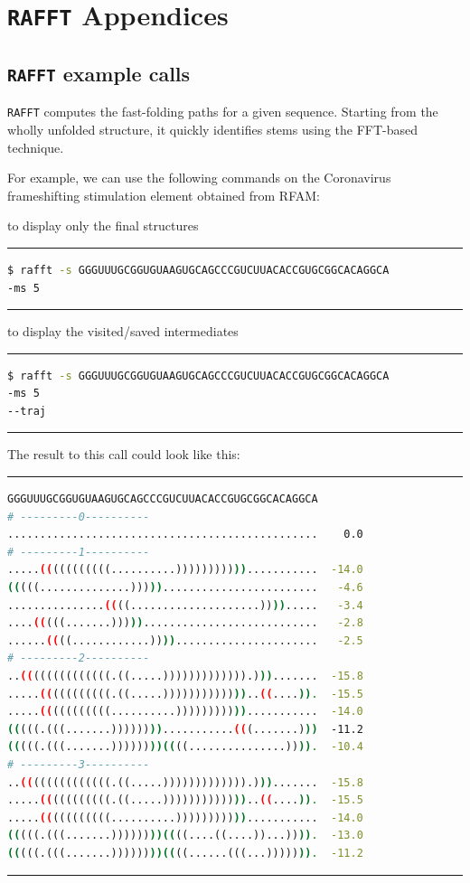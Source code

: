 \chapter{\texttt{RAFFT} Appendices}

\section{\texttt{RAFFT} example calls}

\texttt{RAFFT}  computes the fast-folding paths for a given sequence. Starting from the wholly unfolded structure, it quickly identifies stems using the FFT-based technique.

For example, we can use the following commands on the Coronavirus frameshifting stimulation element obtained from RFAM:

\noindent to display only the final structures

\noindent \rule{12cm}{0.4pt}
\begin{lstlisting}[language=bash, caption={Command line to run \texttt{RAFFT} executable after installation}]
$ rafft -s GGGUUUGCGGUGUAAGUGCAGCCCGUCUUACACCGUGCGGCACAGGCA 
-ms 5 
\end{lstlisting}
\rule{12cm}{0.4pt}

\noindent to display the visited/saved intermediates

\noindent \rule{12cm}{0.4pt}
\begin{lstlisting}[language=bash, caption={Command line to run \texttt{RAFFT} executable after installation}]
$ rafft -s GGGUUUGCGGUGUAAGUGCAGCCCGUCUUACACCGUGCGGCACAGGCA 
-ms 5 
--traj
\end{lstlisting}
\rule{12cm}{0.4pt}

\noindent The result to this call could look like this: 

\noindent \rule{12cm}{0.4pt}
\begin{lstlisting}[language=bash, caption={\texttt{RAFFT}'s output results}]
GGGUUUGCGGUGUAAGUGCAGCCCGUCUUACACCGUGCGGCACAGGCA
# ---------0----------
................................................    0.0
# ---------1----------
.....(((((((((((..........)))))))))))...........  -14.0
(((((..............)))))........................   -4.6
...............((((....................)))).....   -3.4
....(((((.......)))))...........................   -2.8
......((((............))))......................   -2.5
# ---------2----------
..((((((((((((((.((.....))))))))))))).))).......  -15.8
.....(((((((((((.((.....)))))))))))))..((....)).  -15.5
.....(((((((((((..........)))))))))))...........  -14.0
(((((.(((.......))))))))...........(((.......)))  -11.2
(((((.(((.......))))))))((((...............)))).  -10.4
# ---------3----------
..((((((((((((((.((.....))))))))))))).))).......  -15.8
.....(((((((((((.((.....)))))))))))))..((....)).  -15.5
.....(((((((((((..........)))))))))))...........  -14.0
(((((.(((.......))))))))((((....((....))...)))).  -13.0
(((((.(((.......))))))))((((......(((...))))))).  -11.2
\end{lstlisting}
\noindent \rule{12cm}{0.4pt}


